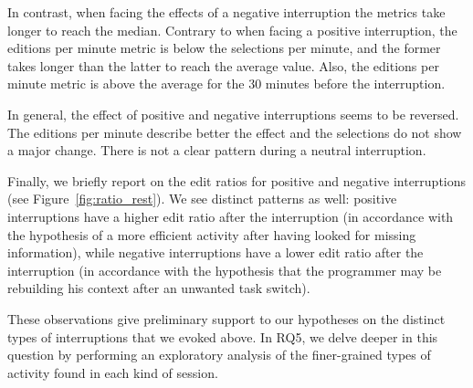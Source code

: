 \documentclass[times]{smrauth}
\begin{document}
In contrast, when facing the effects of a negative interruption the metrics take longer to reach the median. Contrary to when facing a positive interruption, the editions per minute metric is below the selections per minute, and the former takes longer than the latter to reach the average value. Also, the editions per minute metric is above the average for the 30 minutes before the interruption. 

In general, the effect of positive and negative interruptions seems to be reversed. The editions per minute describe better the effect and the selections do not show a major change. There is not a clear pattern during a neutral interruption.

Finally, we briefly report on the edit ratios for positive and negative interruptions (see Figure~\ref{fig:ratio_rest}). We see distinct patterns as well: positive interruptions have a higher edit ratio after the interruption (in accordance with the hypothesis of a more efficient activity after having looked for missing information), while negative interruptions have a lower edit ratio after the interruption (in accordance with the hypothesis that the programmer may be rebuilding his context after an unwanted task switch).

These observations give preliminary support to our hypotheses on the distinct types of interruptions that we evoked above. In RQ5, we delve deeper in this question by performing an exploratory analysis of the finer-grained types of activity found in each kind of session.
\end{document}
